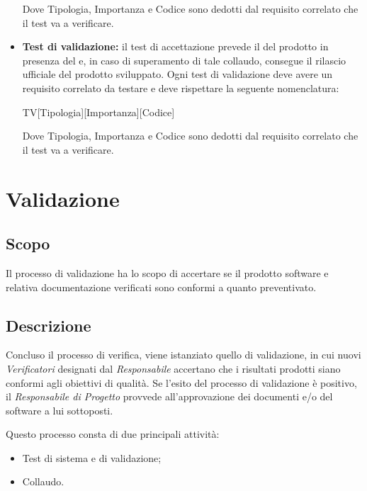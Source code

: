 \documentclass[../NormediProgetto.tex]{subfiles}
\begin{document}
\begin{itemize}
    Dove Tipologia, Importanza e Codice sono dedotti dal requisito correlato che il test va a verificare.

    \item \textbf{Test di validazione:} il test di accettazione prevede il  del prodotto in presenza del  e, in caso di superamento di tale collaudo, consegue il rilascio ufficiale del prodotto sviluppato. Ogni test di validazione deve avere un requisito correlato da testare e deve rispettare la seguente nomenclatura:

    \begin{center}
        TV[Tipologia][Importanza][Codice]
    \end{center}

    Dove Tipologia, Importanza e Codice sono dedotti dal requisito correlato che il test va a verificare.

\end{itemize}


\section{Validazione}

\subsection{Scopo}
Il processo di validazione ha lo scopo di accertare se il prodotto software e relativa documentazione verificati sono conformi a quanto preventivato.

\subsection{Descrizione}
Concluso il processo di verifica, viene istanziato quello di validazione, in cui nuovi \textit{Verificatori} designati dal \textit{Responsabile} accertano che i risultati prodotti siano conformi agli obiettivi di qualità. Se l'esito del processo di validazione è positivo, il \textit{Responsabile di Progetto} provvede all'approvazione dei documenti e/o del software a lui sottoposti.

\noindent Questo processo consta di due principali attività:
\begin{itemize}
    \item Test di sistema e di validazione;
    \item Collaudo.
\end{itemize}
\end{document}
